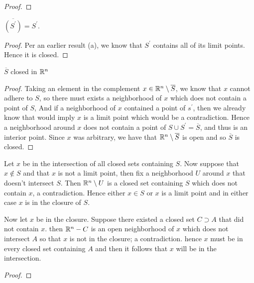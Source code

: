 \begin{alphaparts}
\begin{proof}
        \end{proof}

        \questionpart
        $\overline{(S^\prime)} = S^\prime$. 

        \begin{proof}
            Per an earlier result (a), we know that $S^\prime$ contains all of its limit points. Hence 
            it is closed. 
        \end{proof}


        \questionpart 
        $\overline{S}$ closed in $\mathbb{R}^n$

        \begin{proof}
            Taking an element in the complement $x \in \mathbb{R}^n \setminus \overline{S}$, we know that $x$ cannot adhere to $S$, 
            so there must exists a neighborhood of $x$ which does not contain a point of $S$, And if a neighborhood of $x$ contained a point of $s^\prime$, 
            then we already know that would imply $x$ is a limit point which would be a contradiction. Hence  a neighborhood around $x$ does not 
            contain a point of $S \cup S^\prime = \overline{S}$, and thus is an interior point. Since $x$ was arbitrary, we have that 
            $\mathbb{R}^n \setminus \overline{S}$ is open and so $\overline{S}$ is closed. 

        \end{proof}

        \questionpart 
        Let $x$ be in the intersection of all closed sets containing $S$. Now suppose that $x \notin S$  and that $x$ is not a limit point, 
        then fix a neighborhood $U$ around $x$ that doesn't intersect $S$. Then $\mathbb{R}^n \setminus U$ is a closed set containing $S$ which does not contain $x$, a contradiction. 
        Hence either $x \in S$ or $x$ is a limit point and in either case $x$ is in the closure of $S$. 

        Now let $x$ be in the closure. Suppose there existed a closed set $C \supset A$ that did not contain $x$. 
        then $\mathbb{R}^n - C$ is an open neighborhood of $x$ which does not intersect $A$ so that $x$ is not in the closure; a contradiction. 
        hence $x$ must be in every closed set containing $A$ and then it follows that $x$ will be in the intersection. 
        \begin{proof}
            
        \end{proof}
    \end{alphaparts}

